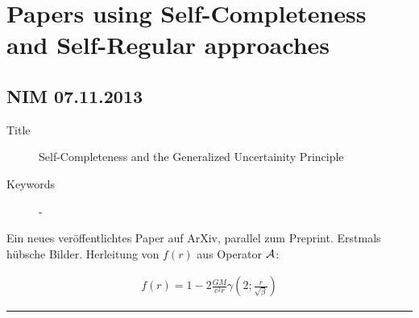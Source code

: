 \documentclass[10pt,a4paper, fleqn]{article}
\begin{document}
\clearpage

\section{Papers using Self-Completeness and Self-Regular approaches}
\begin{multicols}{2}
\subsection{NIM 07.11.2013}
\begin{description}
  \item[Title] Self-Completeness and the Generalized Uncertainity Principle
  \item[Keywords] -
\end{description}
Ein neues veröffentlichtes Paper auf ArXiv, parallel zum Preprint. Erstmals hübsche Bilder. Herleitung von $f(r)$ aus Operator $\cal A$:

\vfill
\columnbreak
\begin{align}
f(r) = 1 - 2 \frac{G M}{c^2 r} \gamma( 2; \frac{r}{\sqrt{\beta}} )
\end{align}
\end{multicols}
\rule{0.9\textwidth}{0.4pt}








\end{document}
